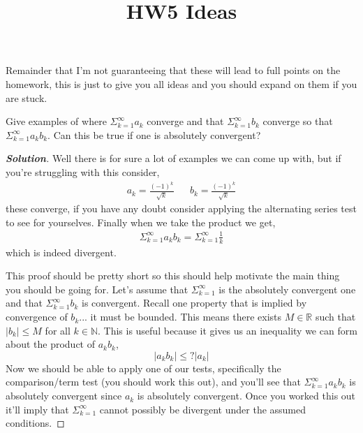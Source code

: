 \documentclass[11pt]{article}
\newenvironment{problem}[2][Problem\!]{\begin{trivlist}
\item[\hskip \labelsep {\bfseries #1}\hskip \labelsep {\bfseries #2}]}{\end{trivlist}}
\newenvironment{solution}{\begin{proof}[\textbf{\textit{Solution}}] }{\end{proof}}
\newcommand{\rr}{\mathbb R}   %
\newcommand{\nn}{\mathbb N}   %
\newcommand{\abs}[1]{\left\lvert#1\right\rvert} %
\renewcommand{\leq}{\leqslant}
\begin{document}
 
\title{HW5 Ideas}

\date{} 
\maketitle


Remainder that I'm not guaranteeing that these will lead to full points on the homework, this is just to give you all ideas and you should expand on them if you are stuck. 
\begin{tcolorbox}
  \begin{problem} {12.2}
    Give examples of where $\Sigma_{k=1}^{\infty} a_k$ converge and that $\Sigma_{k=1}^{\infty} b_k$ converge so that $\Sigma_{k=1}^{\infty}a_kb_k$. Can this be true if one is absolutely convergent?
  \end{problem} 
\end{tcolorbox}
\begin{solution}
    Well there is for sure a lot of examples we can come up with, but if you're struggling with this consider,
    \begin{align*}
        a_k = \frac{(-1)^{k}}{\sqrt{k}} && b_k = \frac{(-1)^{k}}{\sqrt{k}}
    \end{align*}
    these converge, if you have any doubt consider applying the alternating series test to see for yourselves. Finally when we take the product we get,
    \begin{align*}
        \Sigma_{k=1}^{\infty} a_k b_k = \Sigma_{k=1}^{\infty}\frac{1}{k}
    \end{align*}
    which is indeed divergent. 

    This proof should be pretty short so this should help motivate the main thing you should be going for. Let's assume that $\Sigma_{k=1}^{\infty}$ is the absolutely convergent one and that $\Sigma_{k =1 }^{\infty}b_k$ is convergent. Recall one property that is implied by convergence of $b_k$... it must be bounded. This means there exists $M \in \rr$ such that $|b_k| \leq M $ for all $ k \in \nn$. This is useful because it gives us an inequality we can form about the product of $a_kb_k$,
    \[\abs{a_kb_k} \leq ? \abs{a_k}\]
    Now we should be able to apply one of our tests, specifically the comparison/term test (you should work this out), and you'll see that $\Sigma_{k=1}^{\infty}a_kb_k$ is absolutely convergent since $a_k$ is absolutely convergent. Once you worked this out it'll imply that $\Sigma_{k =1 }^{\infty}$ cannot possibly be divergent under the assumed conditions. 
\end{solution}
\end{document}
